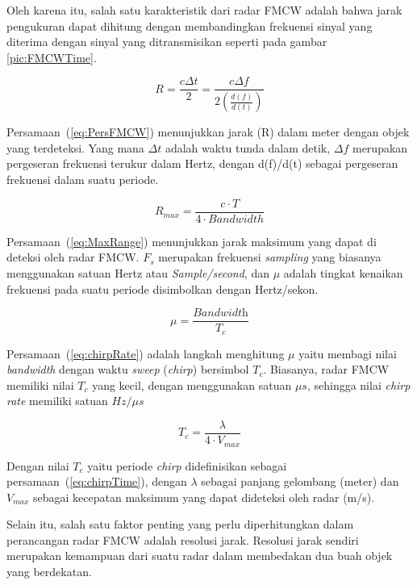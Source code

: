 Oleh karena itu, salah satu karakteristik dari radar FMCW adalah bahwa jarak pengukuran dapat dihitung dengan membandingkan frekuensi sinyal yang diterima dengan sinyal yang ditransmisikan seperti pada gambar \ref{pic:FMCWTime}.   

\begin{equation} 
	R = \frac{c \Delta{t}}{2} = \frac{c \Delta{f}}{2(\frac{d(f)}{d(t)})}
	\label{eq:PersFMCW}
\end{equation}

Persamaan~(\ref{eq:PersFMCW}) menunjukkan jarak (R) dalam meter dengan objek yang terdeteksi. Yang mana $\Delta{t}$ adalah waktu tunda dalam detik, $\Delta{f}$ merupakan pergeseran frekuensi terukur dalam Hertz, dengan d(f)/d(t) sebagai pergeseran frekuensi dalam suatu periode. 

\begin{equation}
	R_{max} = \frac{c \cdot T}{4 \cdot Bandwidth}
	\label{eq:MaxRange}
\end{equation}

Persamaan~(\ref{eq:MaxRange}) menunjukkan jarak maksimum yang dapat di deteksi oleh radar FMCW. $F_{s}$ merupakan frekuensi \textit{sampling} yang biasanya menggunakan satuan Hertz atau \textit{Sample/second}, dan $\mu$ adalah tingkat kenaikan frekuensi pada suatu periode disimbolkan dengan Hertz/sekon.

\begin{equation}
	\mu = \frac{\textit{Bandwidth}}{T_{c}}
	\label{eq:chirpRate}
\end{equation}

Persamaan~(\ref{eq:chirpRate}) adalah langkah menghitung $\mu$ yaitu membagi nilai \textit{bandwidth} dengan waktu \textit{sweep} (\textit{chirp}) bersimbol $T_{c}$. Biasanya, radar FMCW memiliki nilai $T_{c}$ yang kecil, dengan menggunakan satuan $\mu s$, sehingga nilai \textit{chirp rate} memiliki satuan $Hz/\mu s$

\begin{equation}
	T_{c} = \frac{\lambda}{4 \cdot V_{max}}
	\label{eq:chirpTime}
\end{equation}

Dengan nilai $T_{c}$ yaitu periode \textit{chirp} didefinisikan sebagai persamaan~(\ref{eq:chirpTime}), dengan $\lambda$ sebagai panjang gelombang (meter) dan $V_{max}$ sebagai kecepatan maksimum yang dapat dideteksi oleh radar (m/s).

Selain itu, salah satu faktor penting yang perlu diperhitungkan dalam perancangan radar FMCW adalah resolusi jarak. Resolusi jarak sendiri merupakan kemampuan dari suatu radar dalam membedakan dua buah objek yang berdekatan.

